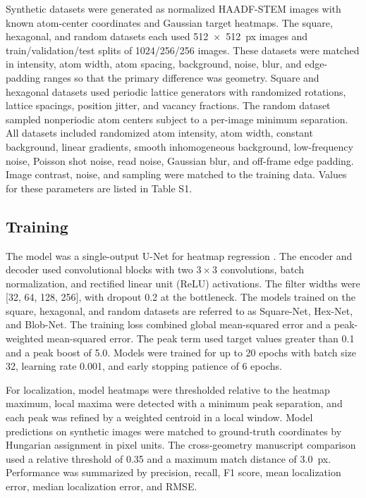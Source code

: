 Synthetic datasets were generated as normalized HAADF-STEM images with known atom-center coordinates and Gaussian target heatmaps. The square, hexagonal, and random datasets each used 512~$\times$~512~px images and train/validation/test splits of 1024/256/256 images. These datasets were matched in intensity, atom width, atom spacing, background, noise, blur, and edge-padding ranges so that the primary difference was geometry. Square and hexagonal datasets used periodic lattice generators with randomized rotations, lattice spacings, position jitter, and vacancy fractions. The random dataset sampled nonperiodic atom centers subject to a per-image minimum separation. All datasets included randomized atom intensity, atom width, constant background, linear gradients, smooth inhomogeneous background, low-frequency noise, Poisson shot noise, read noise, Gaussian blur, and off-frame edge padding. Image contrast, noise, and sampling were matched to the training data. Values for these parameters are listed in Table S1.

\subsection{Training}

The model was a single-output U-Net for heatmap regression \cite{Ronneberger2015}. The encoder and decoder used convolutional blocks with two $3 \times 3$ convolutions, batch normalization, and rectified linear unit (ReLU) activations. The filter widths were [32, 64, 128, 256], with dropout 0.2 at the bottleneck. The models trained on the square, hexagonal, and random datasets are referred to as Square-Net, Hex-Net, and Blob-Net. The training loss combined global mean-squared error and a peak-weighted mean-squared error. The peak term used target values greater than 0.1 and a peak boost of 5.0. Models were trained for up to 20 epochs with batch size 32, learning rate 0.001, and early stopping patience of 6 epochs.

For localization, model heatmaps were thresholded relative to the heatmap maximum, local maxima were detected with a minimum peak separation, and each peak was refined by a weighted centroid in a local window. Model predictions on synthetic images were matched to ground-truth coordinates by Hungarian assignment in pixel units. The cross-geometry manuscript comparison used a relative threshold of 0.35 and a maximum match distance of 3.0~px. Performance was summarized by precision, recall, F1 score, mean localization error, median localization error, and RMSE.

